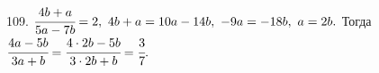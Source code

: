 109. $\cfrac{4b+a}{5a-7b}=2,\ 4b+a=10a-14b,\ -9a=-18b,\ a=2b.$ Тогда $\cfrac{4a-5b}{3a+b}=\cfrac{4\cdot2b-5b}{3\cdot2b+b}=\cfrac{3}{7}.$\\
